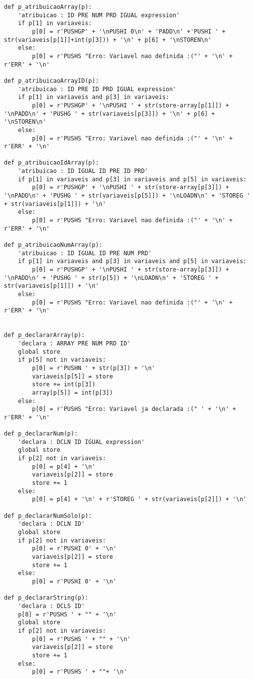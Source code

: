 \documentclass[11pt,a4paper]{report}%
\begin{document}
\begin{lstlisting}
def p_atribuicaoArray(p):
    'atribuicao : ID PRE NUM PRD IGUAL expression'
    if p[1] in variaveis: 
        p[0] = r'PUSHGP' + '\nPUSHI 0\n' + 'PADD\n' +'PUSHI ' + str(variaveis[p[1]]+int(p[3])) + '\n' + p[6] + '\nSTOREN\n'
    else: 
        p[0] = r'PUSHS "Erro: Variavel nao definida :("' + '\n' + r'ERR' + '\n' 

def p_atribuicaoArrayID(p):
    'atribuicao : ID PRE ID PRD IGUAL expression'
    if p[1] in variaveis and p[3] in variaveis: 
        p[0] = r'PUSHGP' + '\nPUSHI ' + str(store-array[p[1]]) + '\nPADD\n' + 'PUSHG ' + str(variaveis[p[3]]) + '\n' + p[6] + '\nSTOREN\n'
    else: 
        p[0] = r'PUSHS "Erro: Variavel nao definida :("' + '\n' + r'ERR' + '\n' 

def p_atribuicaoIdArray(p):
    'atribuicao : ID IGUAL ID PRE ID PRD'
    if p[1] in variaveis and p[3] in variaveis and p[5] in variaveis: 
        p[0] = r'PUSHGP' + '\nPUSHI ' + str(store-array[p[3]]) + '\nPADD\n' + 'PUSHG ' + str(variaveis[p[5]]) + '\nLOADN\n' + 'STOREG ' + str(variaveis[p[1]]) + '\n'
    else: 
        p[0] = r'PUSHS "Erro: Variavel nao definida :("' + '\n' + r'ERR' + '\n' 

def p_atribuicaoNumArray(p):
    'atribuicao : ID IGUAL ID PRE NUM PRD'
    if p[1] in variaveis and p[3] in variaveis and p[5] in variaveis: 
        p[0] = r'PUSHGP' + '\nPUSHI ' + str(store-array[p[3]]) + '\nPADD\n' + 'PUSHG ' + str(p[5]) + '\nLOADN\n' + 'STOREG ' + str(variaveis[p[1]]) + '\n'
    else: 
        p[0] = r'PUSHS "Erro: Variavel nao definida :("' + '\n' + r'ERR' + '\n' 


def p_declararArray(p): 
    'declara : ARRAY PRE NUM PRD ID'
    global store
    if p[5] not in variaveis: 
        p[0] = r'PUSHN ' + str(p[3]) + '\n'
        variaveis[p[5]] = store
        store += int(p[3])
        array[p[5]] = int(p[3])
    else: 
        p[0] = r'PUSHS "Erro: Variavel ja declarada :(" ' + '\n' + r'ERR' + '\n'

def p_declararNum(p): 
    'declara : DCLN ID IGUAL expression'
    global store
    if p[2] not in variaveis: 
        p[0] = p[4] + '\n'
        variaveis[p[2]] = store
        store += 1
    else: 
        p[0] = p[4] + '\n' + r'STOREG ' + str(variaveis[p[2]]) + '\n'

def p_declararNumSolo(p): 
    'declara : DCLN ID'
    global store
    if p[2] not in variaveis: 
        p[0] = r'PUSHI 0' + '\n'
        variaveis[p[2]] = store
        store += 1
    else: 
        p[0] = r'PUSHI 0' + '\n'

def p_declararString(p): 
    'declara : DCLS ID'
    p[0] = r'PUSHS ' + "" + '\n'
    global store
    if p[2] not in variaveis: 
        p[0] = r'PUSHS ' + "" + '\n'
        variaveis[p[2]] = store
        store += 1
    else: 
        p[0] = r'PUSHS ' + ""+ '\n'


\end{lstlisting}
\end{document}
